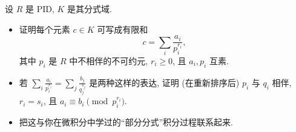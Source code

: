 \begin{prob}
\label{ex:pid-partial-fractions}
设 $R$ 是 PID, $K$ 是其分式域.
\begin{itemize}
\item 证明每个元素 $c\in K$ 可写成有限和
\[
c = \sum_i \frac{a_i}{p_i^{r_i}},
\]
其中 $p_i$ 是 $R$ 中不相伴的不可约元, $r_i\ge 0$, 且 $a_i,p_i$ 互素.
\item 若 $\sum_i \frac{a_i}{p_i^{r_i}} = \sum_j \frac{b_j}{q_j^{s_j}}$ 是两种这样的表达, 证明 (在重新排序后) $p_i$ 与 $q_i$ 相伴, $r_i=s_i$, 且 $a_i\equiv b_i \pmod{p_i^{r_i}}$.
\item 把这与你在微积分中学过的``部分分式''积分过程联系起来.
\end{itemize}
\end{prob}

